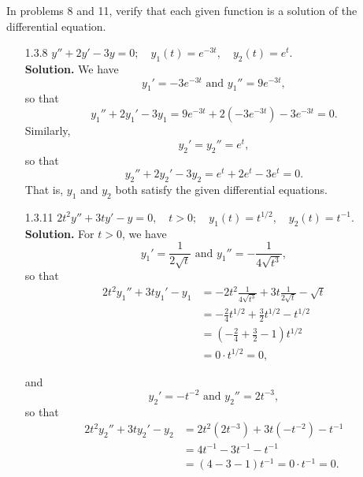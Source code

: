 In problems 8 and 11, verify that each given function is a solution of the
differential equation.
\begin{enumerate}
   \item[1.3.8]   $y'' + 2y' - 3y = 0; \quad y_1(t) = e^{-3t},
                                       \quad y_2(t) = e^t$. \\

      \textbf{Solution.} We have
      $${y_1}' = -3e^{-3t} \text{ and } {y_1}'' = 9e^{-3t},$$
      so that
      $${y_1}'' + 2{y_1}' - 3y_1 = 9e^{-3t} + 2(-3e^{-3t}) - 3e^{-3t} = 0.$$
      Similarly,
      $${y_2}' = {y_2}'' = e^t,$$
      so that
      $${y_2}'' + 2{y_2}' - 3y_2 = e^t + 2e^t - 3e^t = 0.$$
      That is, $y_1$ and $y_2$ both satisfy the given differential equations.
      
   \item[1.3.11]  $2t^2y'' + 3ty' - y = 0, \quad t > 0; \quad y_1(t) = t^{1/2}, 
                                           \quad y_2(t) = t^{-1}$. \\

      \textbf{Solution.} For $t > 0$, we have
      $${y_1}' = \frac{1}{2\sqrt{t}} \text{ and }
        {y_1}'' = -\frac{1}{4\sqrt{t^3}},$$
      so that
      \begin{align*}
         2t^2{y_1}'' + 3t{y_1}' - {y_1} &= -2t^2\frac{1}{4\sqrt{t^3}} +
            3t\frac{1}{2\sqrt{t}} - \sqrt{t} \\
            &= -\frac{2}{4}t^{1/2} + \frac{3}{2}t^{1/2} - t^{1/2} \\
            &= \left(-\frac{2}{4} + \frac{3}{2} - 1\right)t^{1/2} \\
            & = 0 \cdot t^{1/2} = 0,
      \end{align*}

      and
      $${y_2}' = -t^{-2} \text{ and } {y_2}'' = 2t^{-3},$$
      so that
      \begin{align*}
         2t^2{y_2}'' + 3t{y_2}' - {y_2} &= 2t^2(2t^{-3}) +
            3t(-t^{-2}) - t^{-1} \\
            &= 4t^{-1} - 3t^{-1} - t^{-1} \\
            &= (4 - 3 - 1)t^{-1} = 0 \cdot t^{-1} = 0.
      \end{align*}
\end{enumerate}
